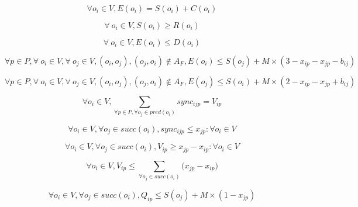 \begin{equation}
\forall o_i \in V, E(o_i) = S(o_i) + C(o_i)
\label{schedRT:const_2}
\end{equation}

\begin{equation}
\forall\ o_i \in V, S(o_i) \geq R(o_i)
\label{schedRT:const_01}
\end{equation}

\begin{equation}
\forall\ o_i \in V, E(o_i) \leq D(o_i)
\label{schedRT:const_02}
\end{equation}

\begin{equation}
\forall p \in P, \forall\ o_i \in V, \forall\ o_j \in V, (o_i,o_j), (o_j,o_i) \notin A_F, E(o_i) \leq S(o_j) + M \times (3 - x_{ip} - x_{jp} - b_{ij}) 
\label{schedRT:const_11}
\end{equation}

\begin{equation}
\forall p \in P, \forall\ o_i \in V, \forall\ o_j \in V, (o_i,o_j), (o_j,o_i) \notin A_F, E(o_j) \leq S(o_i) + M \times (2 - x_{ip} - x_{jp} + b_{ij}) 
\label{schedRT:const_12}
\end{equation}

\begin{equation}
\forall o_i \in V, \sum_{\forall p \in P, \forall o_j \in pred(o_i)}sync_{ijp}= V_{ip}
\label{schedRT:const_3}
\end{equation}

\begin{equation}
\forall o_i \in V, \forall o_j \in succ(o_i), sync_{ijp} \leq x_{jp}: \forall o_i \in V
\label{schedRT:const_4}
\end{equation}

\begin{equation}
\forall o_i \in V, \forall o_j \in succ(o_i), V_{ip} \geq x_{jp} - x_{ip}: \forall o_i \in V
\label{schedRT:const_5}
\end{equation}

\begin{equation}
 \forall o_i \in V, V_{ip} \leq \sum_{\forall o_j \in succ(o_i)}\big(x_{jp} - x_{ip}\big)
\label{schedRT:const_6}
\end{equation}

\begin{equation}
\forall o_i \in V, \forall o_j \in succ(o_i), Q_{ip} \leq S(o_j) + M \times (1-x_{jp})
\label{schedRT:const_7}
\end{equation}

